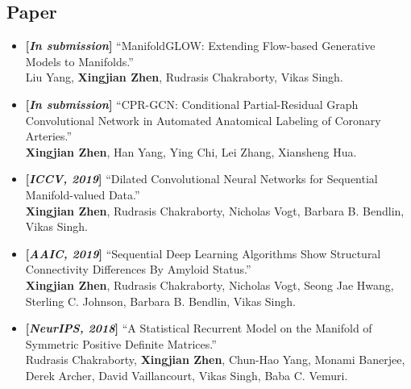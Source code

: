 \documentclass[margin]{res}
\begin{document}
\begin{resume}
\section{Paper}
                \begin{itemize}\itemsep -2.2pt
                \item \textbf{[\emph{In submission}]} ``ManifoldGLOW: Extending Flow-based Generative Models to Manifolds.''\\
                            Liu Yang, \textbf{Xingjian Zhen}, Rudrasis Chakraborty, Vikas Singh.   
                \item \textbf{[\emph{In submission}]} ``CPR-GCN: Conditional Partial-Residual Graph Convolutional Network in Automated Anatomical Labeling of Coronary Arteries.''\\
                            \textbf{Xingjian Zhen}, Han Yang, Ying Chi, Lei Zhang, Xiansheng Hua.   
                \item \textbf{[\emph{ICCV, 2019}]} ``Dilated Convolutional Neural Networks for Sequential Manifold-valued Data.'' \\
                             \textbf{Xingjian Zhen}, Rudrasis Chakraborty, Nicholas Vogt, Barbara B. Bendlin, Vikas Singh. 
                \item \textbf{[\emph{AAIC, 2019}]} ``Sequential Deep Learning Algorithms Show Structural Connectivity Differences By Amyloid Status.''\\
                             \textbf{Xingjian Zhen}, Rudrasis Chakraborty, Nicholas Vogt, Seong Jae Hwang, Sterling C. Johnson, Barbara B. Bendlin, Vikas Singh. 
                \item \textbf{[\emph{NeurIPS, 2018}]} ``A Statistical Recurrent Model on the Manifold of Symmetric Positive Definite Matrices.''\\
                             Rudrasis Chakraborty, \textbf{Xingjian Zhen}, Chun-Hao Yang, Monami Banerjee, Derek Archer, David Vaillancourt, Vikas Singh, Baba C. Vemuri.
                \end{itemize}


\end{resume}
\end{document}

